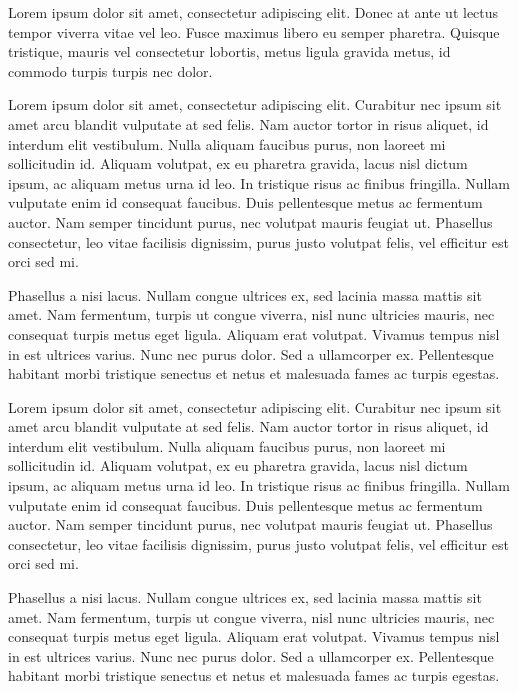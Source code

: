 \documentclass[
  letterpaper,
  DIV=11,
  numbers=noendperiod]{scrreprt}
\begin{document}
Lorem ipsum dolor sit amet, consectetur adipiscing elit. Donec at ante
ut lectus tempor viverra vitae vel leo. Fusce maximus libero eu semper
pharetra. Quisque tristique, mauris vel consectetur lobortis, metus
ligula gravida metus, id commodo turpis turpis nec dolor.

Lorem ipsum dolor sit amet, consectetur adipiscing elit. Curabitur nec
ipsum sit amet arcu blandit vulputate at sed felis. Nam auctor tortor in
risus aliquet, id interdum elit vestibulum. Nulla aliquam faucibus
purus, non laoreet mi sollicitudin id. Aliquam volutpat, ex eu pharetra
gravida, lacus nisl dictum ipsum, ac aliquam metus urna id leo. In
tristique risus ac finibus fringilla. Nullam vulputate enim id consequat
faucibus. Duis pellentesque metus ac fermentum auctor. Nam semper
tincidunt purus, nec volutpat mauris feugiat ut. Phasellus consectetur,
leo vitae facilisis dignissim, purus justo volutpat felis, vel efficitur
est orci sed mi.

Phasellus a nisi lacus. Nullam congue ultrices ex, sed lacinia massa
mattis sit amet. Nam fermentum, turpis ut congue viverra, nisl nunc
ultricies mauris, nec consequat turpis metus eget ligula. Aliquam erat
volutpat. Vivamus tempus nisl in est ultrices varius. Nunc nec purus
dolor. Sed a ullamcorper ex. Pellentesque habitant morbi tristique
senectus et netus et malesuada fames ac turpis egestas.

Lorem ipsum dolor sit amet, consectetur adipiscing elit. Curabitur nec
ipsum sit amet arcu blandit vulputate at sed felis. Nam auctor tortor in
risus aliquet, id interdum elit vestibulum. Nulla aliquam faucibus
purus, non laoreet mi sollicitudin id. Aliquam volutpat, ex eu pharetra
gravida, lacus nisl dictum ipsum, ac aliquam metus urna id leo. In
tristique risus ac finibus fringilla. Nullam vulputate enim id consequat
faucibus. Duis pellentesque metus ac fermentum auctor. Nam semper
tincidunt purus, nec volutpat mauris feugiat ut. Phasellus consectetur,
leo vitae facilisis dignissim, purus justo volutpat felis, vel efficitur
est orci sed mi.

Phasellus a nisi lacus. Nullam congue ultrices ex, sed lacinia massa
mattis sit amet. Nam fermentum, turpis ut congue viverra, nisl nunc
ultricies mauris, nec consequat turpis metus eget ligula. Aliquam erat
volutpat. Vivamus tempus nisl in est ultrices varius. Nunc nec purus
dolor. Sed a ullamcorper ex. Pellentesque habitant morbi tristique
senectus et netus et malesuada fames ac turpis egestas.

\end{document}
